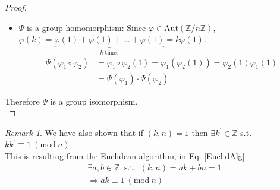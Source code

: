 \documentclass{article}
\theoremstyle{definition}
\theoremstyle{remark}
\newtheorem*{remark}{Remark}
\begin{document}
\begin{proof}
\begin{itemize}
		\item $\Psi$ is a group homomorphism:
			  Since $\varphi\in\mathrm{Aut}(\mathbb{Z}/n\mathbb{Z})$, $\varphi(k)=\underbrace{\varphi(1)+\varphi(1)+...+\varphi(1)}_{k\text{ times}}=k\varphi(1)$.\\
		      \begin{align*}
			      \Psi(\varphi_1\circ\varphi_2) & =\varphi_1\circ\varphi_2(1) =\varphi_1(\varphi_2(1))=\varphi_2(1)\varphi_1(1) \\
			                                    & =\Psi(\varphi_1)\cdot\Psi(\varphi_2)
			  \end{align*}
	\end{itemize}
	Therefore $\Psi$ is a group isomorphism.\\
\end{proof}
\begin{remark}
	We have also shown that if $(k,n)=1$ then $\exists k^{\prime}\in\mathbb{Z}$ s.t. $kk^{\prime}\equiv 1~(\mathrm{mod}~n)$.\\
	This is resulting from the Euclidean algorithm, in Eq. \ref{EuclidAlg}.\\
	\begin{align*}
		\exists a,b\in\mathbb{Z}~\text{ s.t. }~(k,n)=ak+bn=1\\
		\Rightarrow ak\equiv 1~(\mathrm{mod}~n)
	\end{align*} 
\end{remark}
\end{document}
